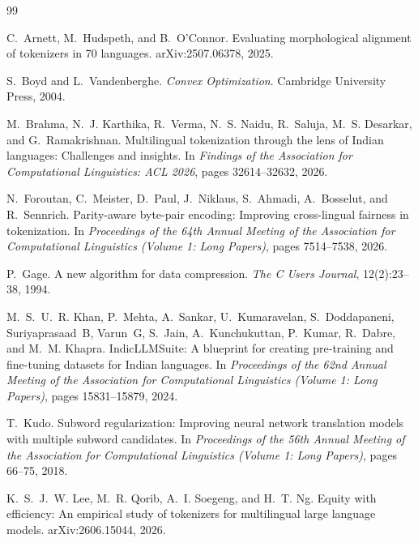 \documentclass[11pt,a4paper]{article}
\theoremstyle{remark}
\begin{document}
\begin{thebibliography}{99}\small

C.~Arnett, M.~Hudspeth, and B.~O'Connor.
\newblock Evaluating morphological alignment of tokenizers in 70 languages.
\newblock arXiv:2507.06378, 2025.

S.~Boyd and L.~Vandenberghe.
\newblock \emph{Convex Optimization}.
\newblock Cambridge University Press, 2004.

M.~Brahma, N.~J. Karthika, R.~Verma, N.~S. Naidu, R.~Saluja, M.~S. Desarkar, and G.~Ramakrishnan.
\newblock Multilingual tokenization through the lens of Indian languages: Challenges and insights.
\newblock In \emph{Findings of the Association for Computational Linguistics: ACL 2026}, pages 32614--32632, 2026.

N.~Foroutan, C.~Meister, D.~Paul, J.~Niklaus, S.~Ahmadi, A.~Bosselut, and R.~Sennrich.
\newblock Parity-aware byte-pair encoding: Improving cross-lingual fairness in tokenization.
\newblock In \emph{Proceedings of the 64th Annual Meeting of the Association for Computational Linguistics (Volume 1: Long Papers)}, pages 7514--7538, 2026.

P.~Gage.
\newblock A new algorithm for data compression.
\newblock \emph{The C Users Journal}, 12(2):23--38, 1994.

M.~S.~U.~R. Khan, P.~Mehta, A.~Sankar, U.~Kumaravelan, S.~Doddapaneni, Suriyaprasaad~B, Varun~G, S.~Jain, A.~Kunchukuttan, P.~Kumar, R.~Dabre, and M.~M. Khapra.
\newblock IndicLLMSuite: A blueprint for creating pre-training and fine-tuning datasets for Indian languages.
\newblock In \emph{Proceedings of the 62nd Annual Meeting of the Association for Computational Linguistics (Volume 1: Long Papers)}, pages 15831--15879, 2024.

T.~Kudo.
\newblock Subword regularization: Improving neural network translation models with multiple subword candidates.
\newblock In \emph{Proceedings of the 56th Annual Meeting of the Association for Computational Linguistics (Volume 1: Long Papers)}, pages 66--75, 2018.

K.~S.~J.~W. Lee, M.~R. Qorib, A.~I. Soegeng, and H.~T. Ng.
\newblock Equity with efficiency: An empirical study of tokenizers for multilingual large language models.
\newblock arXiv:2606.15044, 2026.


\end{thebibliography}
\end{document}
